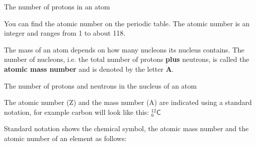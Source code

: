  { \label{m38745*meaningfhsst!!!underscore!!!id284}
      \label{m38745*id255833}The number of protons in an atom \par 
       } 
      
\label{m38745*eip-164}You can find the atomic number on the periodic table. The atomic number is an integer and ranges from 1 to about 118.\par \label{m38745*id255845}The mass of an atom depends on how many nucleons its nucleus contains.
The number of nucleons, i.e. the total number of protons \textbf{plus} neutrons,
is called the \textbf{atomic mass number} and is denoted by the letter \textbf{A}.\par 

 { \label{m38745*meaningfhsst!!!underscore!!!id291}
      \label{m38745*id255874}The number of protons and neutrons in the nucleus of an atom \par 
       } 

The atomic number (Z) and the mass number (A) are indicated using a standard notation, for example carbon will look like this: $_{6}^{12}\mathsf{C}$

      \label{m38753*id255886}Standard notation shows the chemical symbol, the atomic mass number
and the atomic number of an element as follows:\par 
      \label{m38753*id255890}
    \setcounter{subfigure}{0}
	\begin{figure}[H] %
    \begin{center}
\end{center}
 \end{figure}       
 


